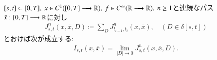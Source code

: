 	\begin{screen}
		\begin{thm}\label{thm:approximation_of_RS_integral_by_high_order_derivatives}
			$[s,t] \subset [0,T],\ x \in C^1([0,T] \longrightarrow \mathbb{R}),\ f \in C^\infty(\mathbb{R} \longrightarrow \mathbb{R}),
			\ n \geq 1$と連続なパス$\bar{x}:[0,T] \longrightarrow \mathbb{R}$に対し
			\begin{align}
				J^n_{s,t}(x,\bar{x},D) \coloneqq \sum_D J^n_{t_{i-1},t_i}(x,\bar{x}),
				\quad (D \in \delta[s,t])
			\end{align}
			とおけば次が成立する:
			\begin{align}
				I_{s,t}(x,\bar{x}) = \lim_{|D| \to 0} J^n_{s,t}(x,\bar{x},D).
				\label{eq:thm_approximation_of_RS_integral_by_high_order_derivatives_1}
			\end{align}
		\end{thm}
	\end{screen}
	
